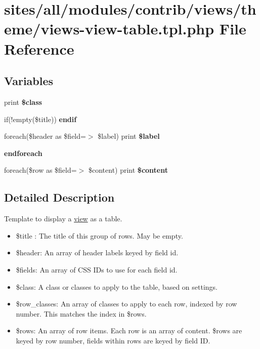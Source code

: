 \hypertarget{views-view-table_8tpl_8php}{
\section{sites/all/modules/contrib/views/theme/views-view-table.tpl.php File Reference}
\label{views-view-table_8tpl_8php}
}
\subsection*{Variables}
\begin{CompactItemize}
\item 
\hypertarget{views-view-table_8tpl_8php_37ff9172f25a6ba53d6e3509c4934849}{
print \textbf{\$class}}
\label{views-view-table_8tpl_8php_37ff9172f25a6ba53d6e3509c4934849}

\item 
\hypertarget{views-view-table_8tpl_8php_de91bc69a503a5ab88f3fdb968225b63}{
if(!empty(\$title)) \textbf{endif}}
\label{views-view-table_8tpl_8php_de91bc69a503a5ab88f3fdb968225b63}

\item 
\hypertarget{views-view-table_8tpl_8php_1d5dd98ba0d76cbc8344f8ee5e22d78e}{
foreach(\$header as \$field=$>$ \$label) print \textbf{\$label}}
\label{views-view-table_8tpl_8php_1d5dd98ba0d76cbc8344f8ee5e22d78e}

\item 
\hypertarget{views-view-table_8tpl_8php_672d9707ef91db026c210f98cc601123}{
\textbf{endforeach}}
\label{views-view-table_8tpl_8php_672d9707ef91db026c210f98cc601123}

\item 
\hypertarget{views-view-table_8tpl_8php_614e7d0c9d34451a4fc2deacd551eb61}{
foreach(\$row as \$field=$>$ \$content) print \textbf{\$content}}
\label{views-view-table_8tpl_8php_614e7d0c9d34451a4fc2deacd551eb61}

\end{CompactItemize}


\subsection{Detailed Description}
Template to display a \hyperlink{classview}{view} as a table.

\begin{itemize}
\item \$title : The title of this group of rows. May be empty.\item \$header: An array of header labels keyed by field id.\item \$fields: An array of CSS IDs to use for each field id.\item \$class: A class or classes to apply to the table, based on settings.\item \$row\_\-classes: An array of classes to apply to each row, indexed by row number. This matches the index in \$rows.\item \$rows: An array of row items. Each row is an array of content. \$rows are keyed by row number, fields within rows are keyed by field ID. \end{itemize}
